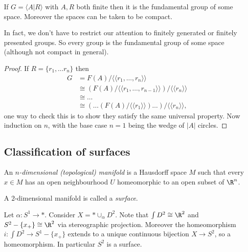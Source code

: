 \documentclass[a4paper]{article}
\begin{document}
\begin{theorem}
  If \(G = \langle A | R \rangle\) with \(A, R\) both finite then it is the fundamental group of some space. Moreover the spaces can be taken to be compact.
\end{theorem}

In fact, we don't have to restrict our attention to finitely generated or finitely presented groups. So every group is the fundamental group of some space (although not compact in general).

\begin{proof}
  If \(R = \{r_1, \dots r_n\}\) then
  \begin{align*}
    G &= F(A) / \langle\langle r_1, \dots, r_n \rangle\rangle \\
      &\cong (F(A) / \langle\langle r_1, \dots, r_{n - 1} \rangle\rangle) / \langle\langle r_n \rangle\rangle \\
      &\cong \dots \\
      &\cong (\dots (F(A)/ \langle \langle r_1 \rangle\rangle) \dots ) / \langle\langle r_n \rangle\rangle,
  \end{align*}
  one way to check this is to show they satisfy the same universal property. Now induction on \(n\), with the base case \(n = 1\) being the wedge of \(|A|\) circles.
\end{proof}

\subsection{Classification of surfaces}

\begin{definition}
  An \emph{\(n\)-dimensional (topological) manifold} is a Hausdorff space \(M\) such that every \(x \in M\) has an open neighbourhood \(U\) homeomorphic to an open subset of \(\R^n\).
\end{definition}

\begin{definition}[surface]
  A \(2\)-dimensional manifold is called a \emph{surface}.
\end{definition}

\begin{eg}
  Let \(\alpha: S^1 \to *\). Consider \(X = * \cup_\alpha D^2\). Note that \(\int D^2 \cong \R^2\) and \(S^2 - \{x_+\} \cong \R^2\) via stereographic projection. Moreover the homeomorphism \(i: \int D^2 \to S^1 - \{x_+\}\) extends to a unique continuous bijection \(X \to S^2\), so a homeomorphism. In particular \(S^2\) is a surface.
\end{eg}
\end{document}
